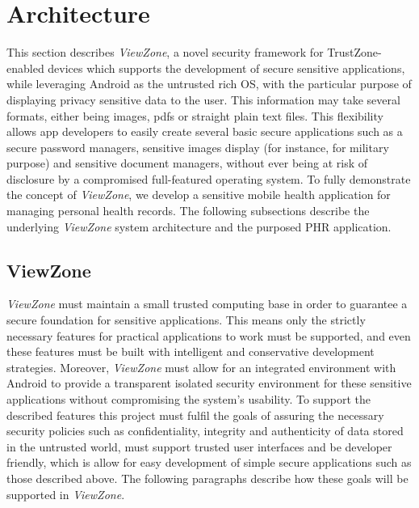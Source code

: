 
% 
% 
\section{Architecture}
\label{sec:architecture}

This section describes \emph{ViewZone}, a novel security framework for TrustZone-enabled devices which supports the development of secure sensitive applications, while leveraging Android as the untrusted rich OS, with the particular purpose of displaying privacy sensitive data to the user. This information may take several formats, either being images, pdfs or straight plain text files. This flexibility allows app developers to easily create several basic secure applications such as a secure password managers, sensitive images display (for instance, for military purpose) and sensitive document managers, without ever being at risk of disclosure by a compromised full-featured operating system. To fully demonstrate the concept of \emph{ViewZone}, we develop a sensitive mobile health application for managing personal health records. The following subsections describe the underlying \emph{ViewZone} system architecture and the purposed \ac{PHR} application.

\subsection{ViewZone}

\emph{ViewZone} must maintain a small trusted computing base in order to guarantee a secure foundation for sensitive applications. This means only the strictly necessary features for practical applications to work must be supported, and even these features must be built with intelligent and conservative development strategies. Moreover, \emph{ViewZone} must allow for an integrated environment with Android to provide a transparent isolated security environment for these sensitive applications without compromising the system's usability. To support the described features this project must fulfil the goals of assuring the necessary security policies such as confidentiality, integrity and authenticity of data stored in the untrusted world, must support trusted user interfaces and be developer friendly, which is allow for easy development of simple secure applications such as those described above. The following paragraphs describe how these goals will be supported in \emph{ViewZone}.

